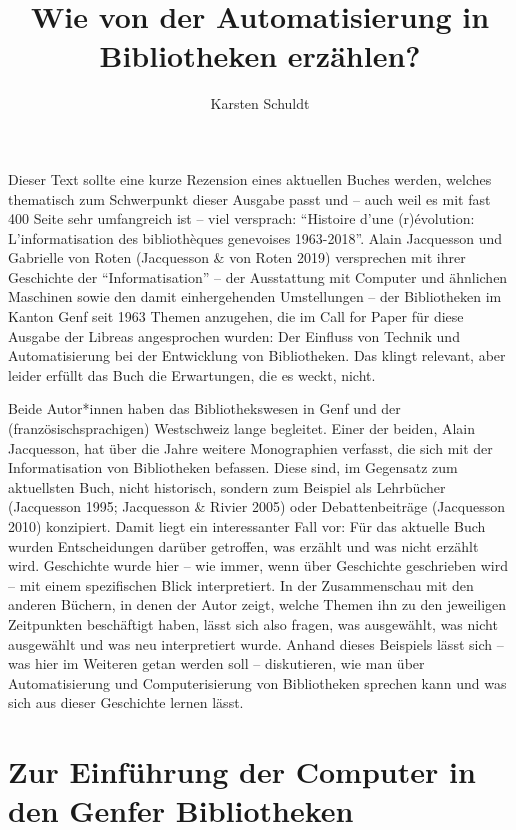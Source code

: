 \documentclass[a4paper,
fontsize=11pt,
oneside,
numbers=noperiodatend,
parskip=half-,
bibliography=totoc,
final
]{scrartcl}
\title{\LARGE{Wie von der Automatisierung in Bibliotheken erzählen?}}%
\author{Karsten Schuldt} %
\date{}
\begin{document}
\maketitle
\thispagestyle{fancyplain} 


Dieser Text sollte eine kurze Rezension eines aktuellen Buches werden,
welches thematisch zum Schwerpunkt dieser Ausgabe passt und -- auch weil
es mit fast 400 Seite sehr umfangreich ist -- viel versprach:
\enquote{Histoire d'une (r)évolution: L'informatisation des
bibliothèques genevoises 1963-2018}. Alain Jacquesson und Gabrielle von
Roten (Jacquesson \& von Roten 2019) versprechen mit ihrer Geschichte
der \enquote{Informatisation} -- der Ausstattung mit Computer und
ähnlichen Maschinen sowie den damit einhergehenden Umstellungen -- der
Bibliotheken im Kanton Genf seit 1963 Themen anzugehen, die im Call for
Paper für diese Ausgabe der Libreas angesprochen wurden: Der Einfluss
von Technik und Automatisierung bei der Entwicklung von Bibliotheken.
Das klingt relevant, aber leider erfüllt das Buch die Erwartungen, die
es weckt, nicht.

Beide Autor*innen haben das Bibliothekswesen in Genf und der
(französischsprachigen) Westschweiz lange begleitet. Einer der beiden,
Alain Jacquesson, hat über die Jahre weitere Monographien verfasst, die
sich mit der Informatisation von Bibliotheken befassen. Diese sind, im
Gegensatz zum aktuellsten Buch, nicht historisch, sondern zum Beispiel
als Lehrbücher (Jacquesson 1995; Jacquesson \& Rivier 2005) oder
Debattenbeiträge (Jacquesson 2010) konzipiert. Damit liegt ein
interessanter Fall vor: Für das aktuelle Buch wurden Entscheidungen
darüber getroffen, was erzählt und was nicht erzählt wird. Geschichte
wurde hier -- wie immer, wenn über Geschichte geschrieben wird -- mit
einem spezifischen Blick interpretiert. In der Zusammenschau mit den
anderen Büchern, in denen der Autor zeigt, welche Themen ihn zu den
jeweiligen Zeitpunkten beschäftigt haben, lässt sich also fragen, was
ausgewählt, was nicht ausgewählt und was neu interpretiert wurde. Anhand
dieses Beispiels lässt sich -- was hier im Weiteren getan werden soll --
diskutieren, wie man über Automatisierung und Computerisierung von
Bibliotheken sprechen kann und was sich aus dieser Geschichte lernen
lässt.

\hypertarget{zur-einfuxfchrung-der-computer-in-den-genfer-bibliotheken}{%
\section{Zur Einführung der Computer in den Genfer
Bibliotheken}\label{zur-einfuxfchrung-der-computer-in-den-genfer-bibliotheken}}
\end{document}
